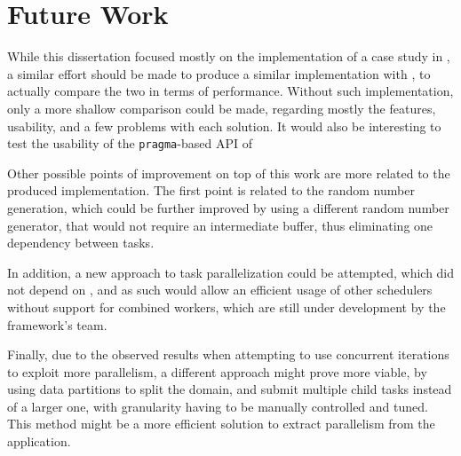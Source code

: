 \documentclass[main.tex]{subfiles}
\begin{document}
\section{Future Work} \label{chapter:future}

While this dissertation focused mostly on the implementation of a case study in \starpu, a similar effort should be made to produce a similar implementation with \gama, to actually compare the two in terms of performance. Without such implementation, only a more shallow comparison could be made, regarding mostly the features, usability, and a few problems with each solution.
It would also be interesting to test the usability of the \texttt{pragma}-based API of \starpu

Other possible points of improvement on top of this work are more related to the produced implementation. The first point is related to the random number generation, which could be further improved by using a different random number generator, that would not require an intermediate buffer, thus eliminating one dependency between tasks.

In addition, a new approach to task parallelization could be attempted, which did not depend on \openmp, and as such would allow an efficient usage of other \starpu schedulers without support for combined workers, which are still under development by the framework's team.

Finally, due to the observed results when attempting to use concurrent iterations to exploit more parallelism, a different approach might prove more viable, by using data partitions to split the domain, and submit multiple child tasks instead of a larger one, with granularity having to be manually controlled and tuned. This method might be a more efficient solution to extract parallelism from the application.
\end{document}
